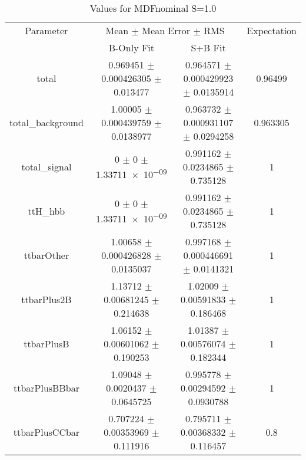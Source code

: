 \begin{table}
\centering
\caption{Values for MDFnominal S=1.0}
\begin{tabular}{cccc}
\toprule
Parameter & \multicolumn{2}{c}{Mean $\pm$ Mean Error $\pm$ RMS} & Expectation\\
 & B-Only Fit & S+B Fit & \\
\midrule
total & \num{0.969451} $\pm$ \num{0.000426305} $\pm$ \num{0.013477} & \num{0.964571} $\pm$ \num{0.000429923} $\pm$ \num{0.0135914} & \num{0.96499}\\
total\_background & \num{1.00005} $\pm$ \num{0.000439759} $\pm$ \num{0.0138977} & \num{0.963732} $\pm$ \num{0.000931107} $\pm$ \num{0.0294258} & \num{0.963305}\\
total\_signal & \num{0} $\pm$ \num{0} $\pm$ \num{1.33711e-09} & \num{0.991162} $\pm$ \num{0.0234865} $\pm$ \num{0.735128} & \num{1}\\
ttH\_hbb & \num{0} $\pm$ \num{0} $\pm$ \num{1.33711e-09} & \num{0.991162} $\pm$ \num{0.0234865} $\pm$ \num{0.735128} & \num{1}\\
ttbarOther & \num{1.00658} $\pm$ \num{0.000426828} $\pm$ \num{0.0135037} & \num{0.997168} $\pm$ \num{0.000446691} $\pm$ \num{0.0141321} & \num{1}\\
ttbarPlus2B & \num{1.13712} $\pm$ \num{0.00681245} $\pm$ \num{0.214638} & \num{1.02009} $\pm$ \num{0.00591833} $\pm$ \num{0.186468} & \num{1}\\
ttbarPlusB & \num{1.06152} $\pm$ \num{0.00601062} $\pm$ \num{0.190253} & \num{1.01387} $\pm$ \num{0.00576074} $\pm$ \num{0.182344} & \num{1}\\
ttbarPlusBBbar & \num{1.09048} $\pm$ \num{0.0020437} $\pm$ \num{0.0645725} & \num{0.995778} $\pm$ \num{0.00294592} $\pm$ \num{0.0930788} & \num{1}\\
ttbarPlusCCbar & \num{0.707224} $\pm$ \num{0.00353969} $\pm$ \num{0.111916} & \num{0.795711} $\pm$ \num{0.00368332} $\pm$ \num{0.116457} & \num{0.8}\\
\bottomrule
\end{tabular}
\end{table}